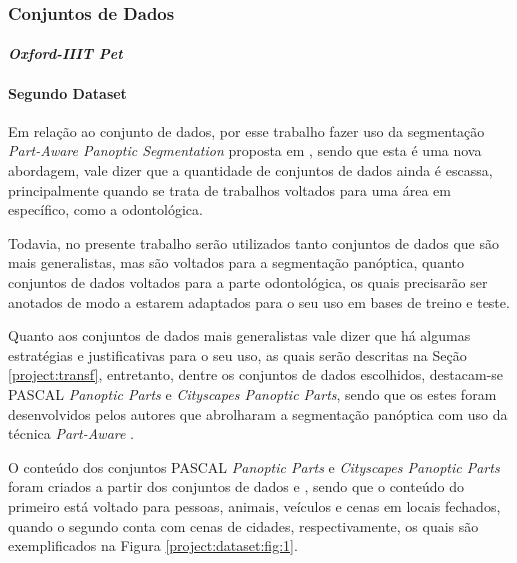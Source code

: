 \subsubsection{Conjuntos de Dados}
\label{project:dataset}

\paragraph{\textit{Oxford-IIIT Pet}}

\paragraph{Segundo Dataset}
Em relação ao conjunto de dados, por esse trabalho fazer uso da segmentação \textit{Part-Aware Panoptic Segmentation} proposta em \cite{DeGeus2021}, sendo que esta é uma nova abordagem, vale dizer que a quantidade de conjuntos de dados ainda é escassa, principalmente quando se trata de trabalhos voltados para uma área em específico, como a odontológica.

Todavia, no presente trabalho serão utilizados tanto conjuntos de dados que são mais generalistas, mas são voltados para a segmentação panóptica, quanto conjuntos de dados voltados para a parte odontológica, os quais precisarão ser anotados de modo a estarem adaptados para o seu uso em bases de treino e teste.

Quanto aos conjuntos de dados mais generalistas vale dizer que há algumas estratégias e justificativas para o seu uso, as quais serão descritas na Seção \ref{project:transf}, entretanto, dentre os conjuntos de dados escolhidos, destacam-se PASCAL \textit{Panoptic Parts} e \textit{Cityscapes Panoptic Parts}, sendo que os estes foram desenvolvidos pelos autores que abrolharam a segmentação panóptica com uso da técnica \textit{Part-Aware} \cite{DeGeus2021}.

O conteúdo dos conjuntos PASCAL \textit{Panoptic Parts} e \textit{Cityscapes Panoptic Parts} foram criados a partir dos conjuntos de dados \cite{everingham2010pascal} e \cite{Cordts2016}, sendo que o conteúdo do primeiro está voltado para pessoas, animais, veículos e cenas em locais fechados, quando o segundo conta com cenas de cidades, respectivamente, os quais são exemplificados na Figura \ref{project:dataset:fig:1}.

